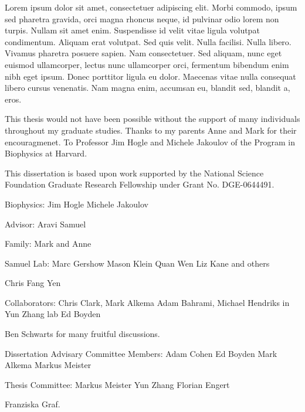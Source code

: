 
Lorem ipsum dolor sit amet, consectetuer adipiscing elit. Morbi commodo, ipsum sed pharetra gravida, orci magna rhoncus neque, id pulvinar odio lorem non turpis. Nullam sit amet enim. Suspendisse id velit vitae ligula volutpat condimentum. Aliquam erat volutpat. Sed quis velit. Nulla facilisi. Nulla libero. Vivamus pharetra posuere sapien. Nam consectetuer. Sed aliquam, nunc eget euismod ullamcorper, lectus nunc ullamcorper orci, fermentum bibendum enim nibh eget ipsum. Donec porttitor ligula eu dolor. Maecenas vitae nulla consequat libero cursus venenatis. Nam magna enim, accumsan eu, blandit sed, blandit a, eros.

This thesis would not have been possible without the support of many individuals throughout my graduate studies. Thanks to my parents Anne and Mark for their encouragmenet. To Professor Jim Hogle and Michele Jakoulov of the Program in Biophysics at Harvard. 

This dissertation is based upon work supported by the National Science Foundation Graduate Research Fellowship under Grant No. DGE-0644491.

Biophysics:
  Jim Hogle
  Michele Jakoulov

Advisor:
  Aravi Samuel

Family:
  Mark and Anne

Samuel Lab:
  Marc Gershow
  Mason Klein
  Quan Wen
  Liz Kane and others

Chris Fang Yen

Collaborators:
   Chris Clark, Mark Alkema
   Adam Bahrami, Michael Hendriks in Yun Zhang lab
   Ed Boyden
   
Ben Schwarts for many fruitful discussions.

Dissertation Advisary Committee Members:
   Adam Cohen
   Ed Boyden
   Mark Alkema
   Markus Meister
   
Thesis Committee:
	Markus Meister
	Yun Zhang
	Florian Engert

Franziska Graf.